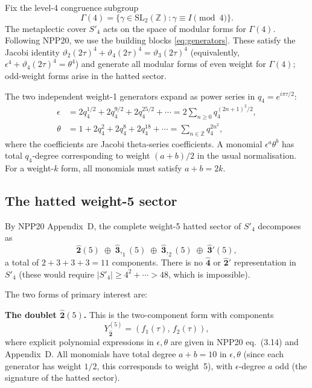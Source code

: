 \documentclass[12pt]{amsart}
\theoremstyle{definition}
\newcommand{\Z}{\mathbb{Z}}
\newcommand{\SL}{\mathrm{SL}}
\newcommand{\hhat}[1]{\widehat{\mathbf{#1}}}  %
\begin{document}
Fix the level-4 congruence subgroup
\[
  \Gamma(4) = \{\gamma \in \SL_2(\Z) : \gamma \equiv I \pmod{4}\}.
\]
The metaplectic cover $S'_4$ acts on the space of modular forms
for $\Gamma(4)$.  Following NPP20, we use the building blocks
\eqref{eq:generators}.
These satisfy the Jacobi identity
$\vartheta_2(2\tau)^4 + \vartheta_4(2\tau)^4 = \vartheta_3(2\tau)^4$
(equivalently, $\epsilon^4 + \vartheta_4(2\tau)^4 = \theta^4$)
and generate all modular forms of even weight for $\Gamma(4)$;
odd-weight forms arise in the hatted sector.

The two independent weight-1 generators expand as power series in
$q_4 = e^{i\pi\tau/2}$:
\begin{align*}
  \epsilon &= 2q_4^{1/2} + 2q_4^{9/2} + 2q_4^{25/2} + \cdots
             = 2\sum_{n \geq 0} q_4^{(2n+1)^2/2}, \\
  \theta   &= 1 + 2q_4^2 + 2q_4^8 + 2q_4^{18} + \cdots
             = \sum_{n \in \Z} q_4^{2n^2},
\end{align*}
where the coefficients are Jacobi theta-series coefficients.
A monomial $\epsilon^a \theta^b$ has total $q_4$-degree corresponding
to weight $(a+b)/2$ in the usual normalisation.
For a weight-$k$ form, all monomials must satisfy $a+b = 2k$.

\subsection{The hatted weight-5 sector}

By NPP20 Appendix~D, the complete weight-5 hatted sector of $S'_4$
decomposes as
\[
  \hhat{2}(5) \;\oplus\; \hhat{3},_1(5) \;\oplus\;
  \hhat{3},_2(5) \;\oplus\; \hhat{3}'(5),
\]
a total of $2 + 3 + 3 + 3 = 11$ components.  There is no $\hhat{4}$
or $\hhat{2}'$ representation in $S'_4$ (these would require
$|S'_4| \geq 4^2 + \cdots > 48$, which is impossible).

The two forms of primary interest are:

\medskip
\noindent\textbf{The doublet $\hhat{2}(5)$.}
This is the two-component form with components
\begin{equation}\label{eq:2hat5}
  Y_{\hhat{2}}^{(5)} = (f_1(\tau),\, f_2(\tau)),
\end{equation}
where explicit polynomial expressions in $\epsilon,\theta$ are given
in NPP20 eq.~(3.14) and Appendix~D.
All monomials have total degree $a+b=10$ in $\epsilon,\theta$
(since each generator has weight $1/2$, this corresponds to weight~5),
with $\epsilon$-degree $a$ odd (the signature of the hatted sector).
\end{document}

